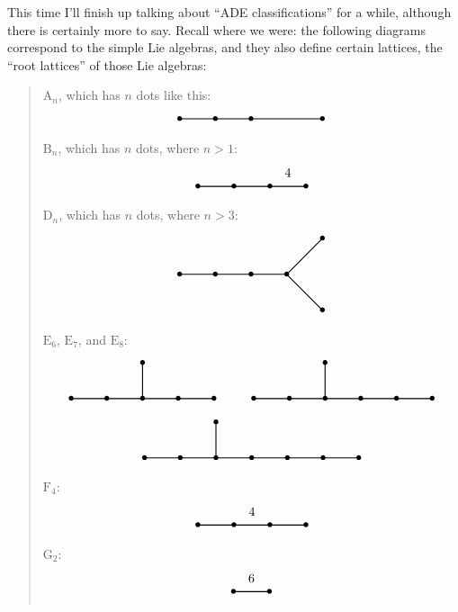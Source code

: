 \documentclass{article}
\begin{document}
This time I'll finish up talking about ``ADE classifications'' for a
while, although there is certainly more to say. Recall where we were:
the following diagrams correspond to the simple Lie algebras, and they
also define certain lattices, the ``root lattices'' of those Lie
algebras:

\begin{quote}
\(\mathrm{A}_n\), which has \(n\) dots like this: \[
  \begin{tikzpicture}
    \draw[thick] (0,0) node{$\bullet$} to (1,0) node{$\bullet$} to (2,0) node {$\bullet$} to (4,0) node{$\bullet$};
  \end{tikzpicture}
\] \(\mathrm{B}_n\), which has \(n\) dots, where \(n > 1\): \[
  \begin{tikzpicture}
    \draw[thick] (0,0) node{$\bullet$} to (1,0) node{$\bullet$} to (2,0) node{$\bullet$} to node[label=above:{4}]{} (3,0) node {$\bullet$};
  \end{tikzpicture}
\] \(\mathrm{D}_n\), which has \(n\) dots, where \(n > 3\): \[
  \begin{tikzpicture}
    \draw[thick] (0,0) node{$\bullet$} to (1,0) node{$\bullet$} to (2,0) node{$\bullet$} to (3,0) node {$\bullet$};
    \draw[thick] (3,0) to (4,1) node {$\bullet$};
    \draw[thick] (3,0) to (4,-1) node {$\bullet$};
  \end{tikzpicture}
\] \(\mathrm{E}_6\), \(\mathrm{E}_7\), and \(\mathrm{E}_8\): \[
  \begin{gathered}
    \begin{tikzpicture}
      \draw[thick] (0,0) node{$\bullet$} to (1,0) node{$\bullet$} to (2,0) node{$\bullet$} to (3,0) node {$\bullet$} to (4,0) node {$\bullet$};
      \draw[thick] (2,0) to (2,1) node{$\bullet$};
    \end{tikzpicture}
    \qquad
    \begin{tikzpicture}
      \draw[thick] (0,0) node{$\bullet$} to (1,0) node{$\bullet$} to (2,0) node{$\bullet$} to (3,0) node {$\bullet$} to (4,0) node {$\bullet$} to (5,0) node {$\bullet$};
      \draw[thick] (2,0) to (2,1) node{$\bullet$};
    \end{tikzpicture}
  \\\begin{tikzpicture}
      \draw[thick] (0,0) node{$\bullet$} to (1,0) node{$\bullet$} to (2,0) node{$\bullet$} to (3,0) node {$\bullet$} to (4,0) node {$\bullet$} to (5,0) node {$\bullet$} to (6,0) node {$\bullet$};
      \draw[thick] (2,0) to (2,1) node{$\bullet$};
    \end{tikzpicture}
  \end{gathered}
\] \(\mathrm{F}_4\): \[
  \begin{tikzpicture}
    \draw[thick] (0,0) node{$\bullet$} to (1,0) node{$\bullet$} to node[label=above:{4}]{} (2,0) node{$\bullet$} to (3,0) node {$\bullet$};
  \end{tikzpicture}
\] \(\mathrm{G}_2\): \[
  \begin{tikzpicture}
    \draw[thick] (0,0) node{$\bullet$} to node[label=above:{6}]{} (1,0) node{$\bullet$};
  \end{tikzpicture}
\]
\end{quote}
\end{document}
